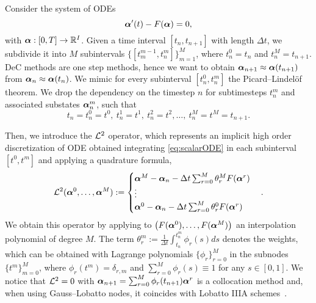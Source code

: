 Consider the system of ODEs
\begin{equation}\label{eq:scalarODE}
	\boldsymbol{\alpha}'(t)-F(\boldsymbol{\alpha})=0,
\end{equation}
with $\boldsymbol{\alpha}:[0,T]\to \mathbb R^I$.
Given a time interval $[t_n, t_{n+1}]$ with length $\Delta t$, we subdivide  
it into $M$ subintervals  $\lbrace [t_m^{m-1},t_n^{m}]\rbrace_{m=1}^M$,
where $t_n^{0} = t_n$ and $t_n^{M} = t_{n+1}$. DeC methods are one step methods, hence we want to obtain $\boldsymbol{\alpha}_{n+1} \approx \boldsymbol{\alpha}(t_{n+1})$ from $\boldsymbol{\alpha}_{n} \approx \boldsymbol{\alpha}(t_{n})$.
We mimic for every 
subinterval $[t_n^0, t_n^m]$ the Picard--Lindel\"of theorem.
We drop the dependency on the timestep $n$ for subtimesteps $t_n^{m}$ 
and associated substates $\boldsymbol{\alpha}_n^{m}$, such that 
\begin{equation*}
	t_n=t_n^{0}=t^0, \ t_n^1=t^1, \ t_n^{2}=t^2, \hdots, \ t_n^{M}=t^M=t_{n+1}.
\end{equation*}

Then, we introduce the $\mathcal L^2$ operator, which represents an implicit high order discretization of ODE obtained integrating \eqref{eq:scalarODE} in each subinterval $[t^0,t^m]$ and applying a quadrature formula, 
\begin{equation}\label{eq:L2}
	\mathcal L^2(\boldsymbol{\alpha}^0, \dots, \boldsymbol{\alpha}^M) :=
	\begin{cases}
		\boldsymbol{\alpha}^M-\boldsymbol{\alpha}_n - \Delta t\sum_{r=0}^M \theta_r^M F(\boldsymbol{\alpha}^r)\\
		\vdots\\
		\boldsymbol{\alpha}^0-\boldsymbol{\alpha}_n - \Delta t\sum_{r=0}^M \theta_r^0 F(\boldsymbol{\alpha}^r)
	\end{cases}.
\end{equation}
We obtain this operator by applying to $\left(F(\boldsymbol{\alpha}^0), \hdots, F(\boldsymbol{\alpha}^M)\right)$ an interpolation polynomial of degree $M$.
The term $\theta_r^m := \frac{1}{\Delta t}\int_{t_n}^{t_n^{m}} \phi_r(s) ds$ denotes the weights, which can be obtained with Lagrange polynomials $\lbrace \phi_r \rbrace_{r=0}^M$ in the subnodes $\lbrace t^m \rbrace_{m=0}^M$, 
where $\phi_r(t^{m})=\delta_{r,m}$ and $\sum_{r=0}^M \phi_r(s) \equiv 1$ for any $s\in [0,1]$. 
We notice that $\mathcal L^2=0$ with $\boldsymbol{\alpha}_{n+1}=\sum_{r=0}^M\phi_r(t_{n+1})\boldsymbol{\alpha}^{r}$ is a collocation method and, when using Gauss--Lobatto nodes, it coincides with Lobatto IIIA schemes~\cite{veiga2023improving}.

